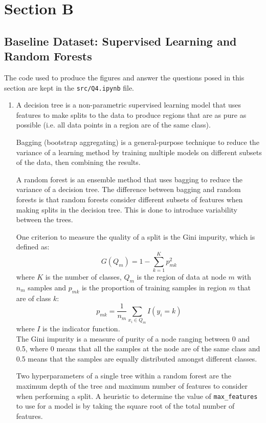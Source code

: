 \documentclass{article}
\begin{document}
\newpage
\section{Section B}
\subsection{Baseline Dataset: Supervised Learning and Random Forests}
The code used to produce the figures and answer the questions posed in this section are kept in the \verb|src/Q4.ipynb| file.
\begin{enumerate}[label=\alph*)]
    \item A decision tree is a non-parametric supervised learning model that uses features to make splits to the data to produce regions that are as pure as possible (i.e. all data points in a region are of the same class).
    
    Bagging (bootstrap aggregating) is a general-purpose technique to reduce the variance of a learning method by training multiple models on different subsets of the data, then combining the results.

    A random forest is an ensemble method that uses bagging to reduce the variance of a decision tree. The difference between bagging and random forests is that random forests consider different subsets of features when making splits in the decision tree. This is done to introduce variability between the trees.

    One criterion to measure the quality of a split is the Gini impurity, which is defined as:
    \begin{equation*}
        G(Q_m)=1-\sum_{k=1}^{K}p_{mk}^2
    \end{equation*}
    where $K$ is the number of classes, $Q_m$ is the region of data at node $m$ with $n_m$ samples and $p_{mk}$ is the proportion of training samples in region $m$ that are of class $k$:
    \begin{equation*}
        p_{mk}=\frac{1}{n_m}\sum_{x_i\in Q_m}I(y_i=k)
    \end{equation*}
    where $I$ is the indicator function.\\
    The Gini impurity is a measure of purity of a node ranging between 0 and 0.5, where 0 means that all the samples at the node are of the same class and 0.5 means that the samples are equally distributed amongst different classes.

    Two hyperparameters of a single tree within a random forest are the maximum depth of the tree and maximum number of features to consider when performing a split. A heuristic to determine the value of \verb|max_features| to use for a model is by taking the square root of the total number of features.


\end{enumerate}
\end{document}
